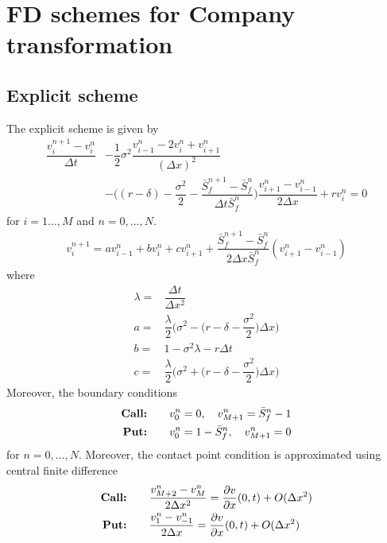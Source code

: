 \section{FD schemes for Company transformation}
\subsection{Explicit scheme}
The explicit scheme is given by
\begin{equation*}
    \begin{split}
      \dfrac{v^{n+1}_{i} - v^{n}_{i}}{\Delta{t}} & - \dfrac{1}{2}\sigma^2 \dfrac{v^{n}_{i-1} - 2v^{n}_{i} + v^{n}_{i+1}}{(\Delta{x})^2} \\ 
       & - \bigg( (r-\delta) - \dfrac{\sigma^2}{2} - \dfrac{\bar{S}^{n+1}_{f} - \bar{S}^{n}_{f}}{\Delta{t}\bar{S}^{n}_{f}} \bigg)\dfrac{v^{n}_{i+1} - v^{n}_{i-1}}{2\Delta{x}} + rv^{n}_{i} = 0
    \end{split}
\end{equation*}
for $i=1\dots,M$ and $n = 0,\dots,N$. 
\begin{equation*}
    \begin{split}
        v^{n+1}_{i} = av^{n}_{i-1} + bv^{n}_{i} + cv^{n}_{i+1} + \dfrac{\bar{S}^{n+1}_{f} - \bar{S}^{n}_{f}}{2\Delta{x}\bar{S}^{n}_{f}}(v^{n}_{i+1} - v^{n}_{i-1})
    \end{split}
\end{equation*}
where 
\begin{equation*}
    \begin{split}
        \lambda =& \dfrac{\Delta{t}}{\Delta{x}^2}\\
        a =& \dfrac{\lambda}{2}\bigg( \sigma^2 - \bigg(r - \delta - \dfrac{\sigma^2}{2}\bigg)\Delta{x} \bigg) \\
        b =& 1 - \sigma^2\lambda- r\Delta{t} \\
        c =& \dfrac{\lambda}{2}\bigg(\sigma^2 + \bigg(r - \delta - \dfrac{\sigma^2}{2}\bigg)\Delta{x}\bigg)
    \end{split}
\end{equation*}
Moreover, the boundary conditions 
\begin{equation*}
    \begin{split}
        \text{\textbf{Call:}} \qquad & v^{n}_{0} = 0, \quad v^{n}_{M+1} = \bar{S}^{n}_{f} - 1 \\
        \text{\textbf{Put:}} \qquad & v^{n}_{0} = 1 - \bar{S}^{n}_{f}, \quad v^{n}_{M+1} = 0 \\
    \end{split}
\end{equation*}
for $n=0,\dots,N$. Moreover, the contact point condition is approximated using central finite difference
\begin{align*}
    \text{\textbf{Call:}} \qquad & \dfrac{v^{n}_{M+2} - v^{n}_{M}}{2\Delta{x}^2} = \dfrac{\partial{v}}{\partial{x}}(0, t) + O(\Delta{x}^2) \\
    \text{\textbf{Put:}} \qquad & \dfrac{v^{n}_{1} - v^{n}_{-1}}{2\Delta{x}} = \dfrac{\partial{v}}{\partial{x}}(0, t)+ O(\Delta{x}^2) 
\end{align*}

